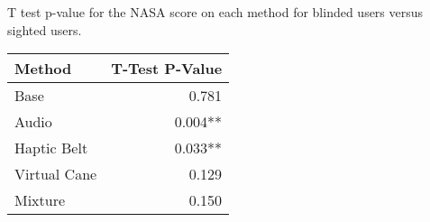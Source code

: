 
\centering
\caption{T test p-value for the NASA score on each method for blinded users versus sighted users.}
\label{tab:ttest_nasa_score}
\begin{tabular}{lr}
\toprule
      Method & T-Test P-Value \\
\midrule
        Base &          0.781 \\
       Audio &        0.004** \\
 Haptic Belt &        0.033** \\
Virtual Cane &          0.129 \\
     Mixture &          0.150 \\
\bottomrule
\end{tabular}
